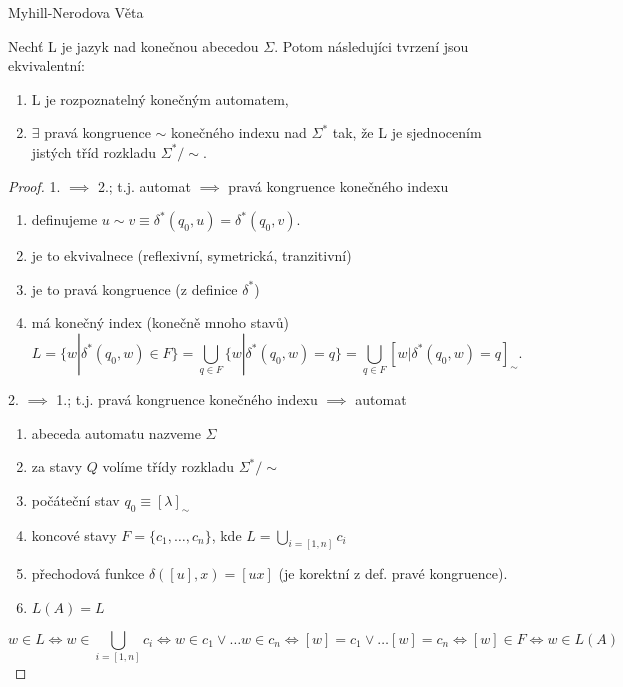 \documentclass[../main.tex]{subfiles}
\begin{document}
\begin{theorem}
    Myhill-Nerodova Věta

    Nechť L je jazyk nad konečnou abecedou $\Sigma$. Potom následujíci tvrzení jsou ekvivalentní:
    \begin{enumerate}
        \item L je rozpoznatelný konečným automatem,
        \item $\exists$ pravá kongruence $\sim$ konečného indexu nad $\Sigma^*$ tak,
        že L je sjednocením jistých tříd rozkladu $\Sigma^*/\sim$.
    \end{enumerate}

    \begin{proof}
        1. $\implies$ 2.; t.j. automat $\implies$ pravá kongruence konečného indexu
        \begin{enumerate}
            \item definujeme $u \sim v \equiv \delta^*(q_0,u) = \delta^*(q_0,v)$.
            \item je to ekvivalnece (reflexivní, symetrická, tranzitivní)
            \item je to pravá kongruence (z definice $\delta^*$)
            \item má konečný index (konečně mnoho stavů)
            \[L = \{w|\delta^* (q_0,w)\in F\} = \bigcup_{q\in F} \{w|\delta^*(q_0,w) = q\}
             = \bigcup_{q\in F}[w|\delta^*(q_0,w) = q]_{\sim}.\]
        \end{enumerate}
        2. $\implies$ 1.; t.j. pravá kongruence konečného indexu $\implies$ automat
        \begin{enumerate}
            \item abeceda automatu nazveme $\Sigma$
            \item za stavy $Q$ volíme třídy rozkladu $\Sigma^*/\sim$
            \item počáteční stav $q_0 \equiv [\lambda]_\sim$
            \item koncové stavy $F=\{c_1,\dots,c_n\}$, kde $L=\bigcup_{i=[1,n]}c_i$
            \item přechodová funkce $\delta([u],x) = [ux]$ (je korektní z def. pravé kongruence).
            \item $L(A) = L$
        \end{enumerate}
        \[w\in L \Leftrightarrow w\in \bigcup_{i=[1,n]}c_i \Leftrightarrow w\in c_1 \vee \dots w \in
        c_n \Leftrightarrow [w] = c_1 \vee \dots [w] = c_n \Leftrightarrow [w]\in F \Leftrightarrow w \in L(A)\]
    \end{proof}
\end{theorem}
\end{document}
